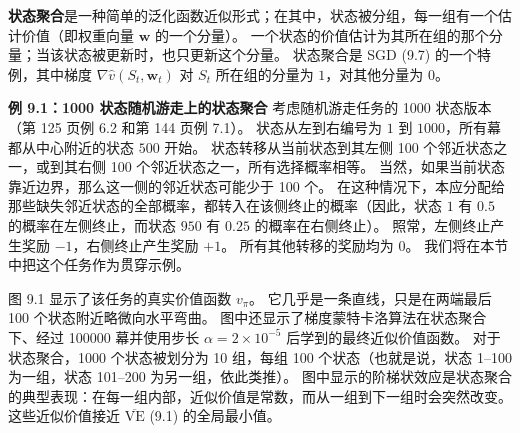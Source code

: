 \documentclass[UTF8,12pt,a4paper,fontset=fandol]{ctexart}
\begin{document}
\begin{center}
\end{center}

\textbf{状态聚合}是一种简单的泛化函数近似形式；在其中，状态被分组，每一组有一个估计价值（即权重向量 $\mathbf{w}$ 的一个分量）。
一个状态的价值估计为其所在组的那个分量；当该状态被更新时，也只更新这个分量。
状态聚合是 SGD (9.7) 的一个特例，其中梯度 $\nabla\hat{v}(S_t,\mathbf{w}_t)$ 对 $S_t$ 所在组的分量为 $1$，对其他分量为 $0$。

\noindent\textbf{例 9.1：1000 状态随机游走上的状态聚合}
考虑随机游走任务的 1000 状态版本（第 125 页例 6.2 和第 144 页例 7.1）。
状态从左到右编号为 $1$ 到 $1000$，所有幕都从中心附近的状态 $500$ 开始。
状态转移从当前状态到其左侧 100 个邻近状态之一，或到其右侧 100 个邻近状态之一，所有选择概率相等。
当然，如果当前状态靠近边界，那么这一侧的邻近状态可能少于 100 个。
在这种情况下，本应分配给那些缺失邻近状态的全部概率，都转入在该侧终止的概率（因此，状态 $1$ 有 $0.5$ 的概率在左侧终止，而状态 $950$ 有 $0.25$ 的概率在右侧终止）。
照常，左侧终止产生奖励 $-1$，右侧终止产生奖励 $+1$。
所有其他转移的奖励均为 $0$。
我们将在本节中把这个任务作为贯穿示例。

图 9.1 显示了该任务的真实价值函数 $v_\pi$。
它几乎是一条直线，只是在两端最后 100 个状态附近略微向水平弯曲。
图中还显示了梯度蒙特卡洛算法在状态聚合下、经过 100000 幕并使用步长 $\alpha=2\times10^{-5}$ 后学到的最终近似价值函数。
对于状态聚合，1000 个状态被划分为 10 组，每组 100 个状态（也就是说，状态 1--100 为一组，状态 101--200 为另一组，依此类推）。
图中显示的阶梯状效应是状态聚合的典型表现：在每一组内部，近似价值是常数，而从一组到下一组时会突然改变。
这些近似价值接近 $\overline{\mathrm{VE}}$ (9.1) 的全局最小值。
\end{document}
